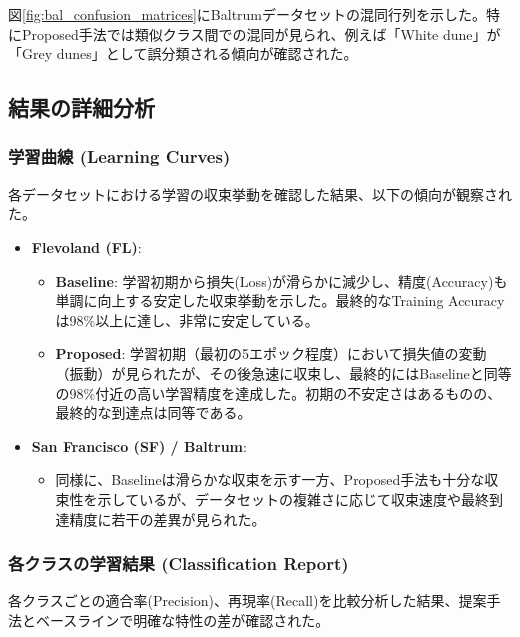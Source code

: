 図\ref{fig:bal_confusion_matrices}にBaltrumデータセットの混同行列を示した。特にProposed手法では類似クラス間での混同が見られ、例えば「White dune」が「Grey dunes」として誤分類される傾向が確認された。



\subsection{結果の詳細分析}

\subsubsection{学習曲線 (Learning Curves)}
各データセットにおける学習の収束挙動を確認した結果、以下の傾向が観察された。

\begin{itemize}
    \item \textbf{Flevoland (FL)}:
    \begin{itemize}
        \item \textbf{Baseline}: 学習初期から損失(Loss)が滑らかに減少し、精度(Accuracy)も単調に向上する安定した収束挙動を示した。最終的なTraining Accuracyは98\%以上に達し、非常に安定している。
        \item \textbf{Proposed}: 学習初期（最初の5エポック程度）において損失値の変動（振動）が見られたが、その後急速に収束し、最終的にはBaselineと同等の98\%付近の高い学習精度を達成した。初期の不安定さはあるものの、最終的な到達点は同等である。
    \end{itemize}
    \item \textbf{San Francisco (SF) / Baltrum}:
    \begin{itemize}
        \item 同様に、Baselineは滑らかな収束を示す一方、Proposed手法も十分な収束性を示しているが、データセットの複雑さに応じて収束速度や最終到達精度に若干の差異が見られた。
    \end{itemize}
\end{itemize}

\subsubsection{各クラスの学習結果 (Classification Report)}
各クラスごとの適合率(Precision)、再現率(Recall)を比較分析した結果、提案手法とベースラインで明確な特性の差が確認された。

